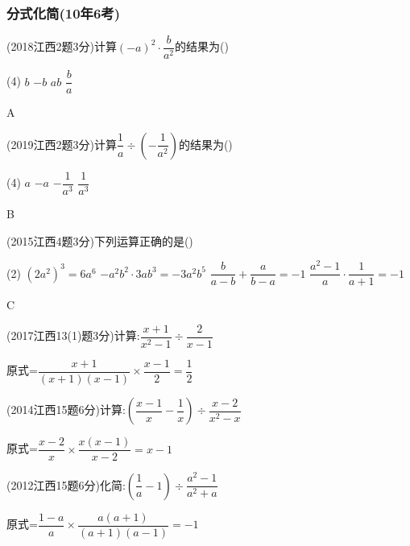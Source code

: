 \documentclass[cn,blue,12pt]{elegantbook}
\begin{document}
\subsubsection{分式化简(10年6考)}%
\begin{zhenti}[resume]
\item (2018江西2题3分)计算\((-a)^2\cdot \dfrac{b}{a^2}\)的结果为(\qquad)\\
    \begin{tasks}(4)
        \task \(b\)
        \task \(-b\)
        \task \(ab\)
        \task \(\dfrac{b}{a}\)
    \end{tasks}
\begin{solution}
        A\\
\end{solution}
\item (2019江西2题3分)计算\(\dfrac{1}{a} \div (-\dfrac{1}{a^2}) \)的结果为(\qquad)\\
    \begin{tasks}(4)
        \task \(a\)
        \task \(-a\)
        \task \(-\dfrac{1}{a^3}\)
        \task \(\dfrac{1}{a^3}\)
    \end{tasks}
\begin{solution}
        B\\
\end{solution}
\item (2015江西4题3分)下列运算正确的是(\qquad)\\
    \begin{tasks}(2)
        \task \((2a^2)^3=6a^6\)
        \task \(-a^2b^2 \cdot 3ab^3 = -3a^2b^5\)
        \task \(\dfrac{b}{a-b}+\dfrac{a}{b-a}=-1\)
        \task \(\dfrac{a^2-1}{a}\cdot \dfrac{1}{a+1}=-1\)
    \end{tasks}
\begin{solution}
        C\\
\end{solution}
\item (2017江西13(1)题3分)计算:\(\dfrac{x+1}{x^2-1}\div \dfrac{2}{x-1}\)
\begin{solution}
        原式=\(\dfrac{x+1}{(x+1)(x-1)}\times \dfrac{x-1}{2}=\dfrac{1}{2}\)
\end{solution}
\item (2014江西15题6分)计算:\((\dfrac{x-1}{x}-\dfrac{1}{x})\div \dfrac{x-2}{x^2-x}\)
\begin{solution}
        原式=\(\dfrac{x-2}{x}\times \dfrac{x(x-1)}{x-2}=x-1\)\\
\end{solution}
\item (2012江西15题6分)化简:\((\dfrac{1}{a}-1)\div \dfrac{a^2-1}{a^2+a}\)
\begin{solution}
        原式=\(\dfrac{1-a}{a}\times \dfrac{a(a+1)}{(a+1)(a-1)}=-1\)\\
\end{solution}
\end{zhenti}
\end{document}

